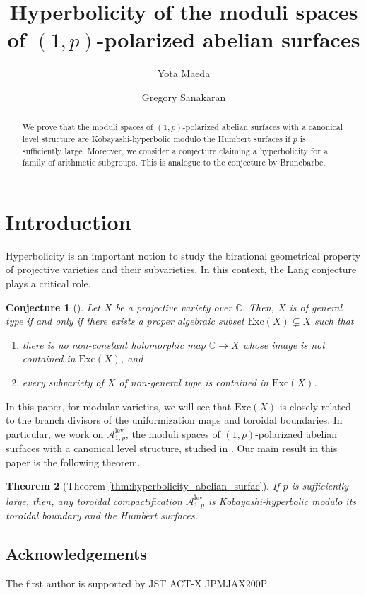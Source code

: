 \documentclass[12pt, pdftex]{amsart}
\title[Hyperbolicity of the moduli spaces of $(1,p)$-polarized abelian surfaces]
{Hyperbolicity of the moduli spaces of $(1,p)$-polarized 
abelian surfaces}
\author{Yota Maeda}
\author{Gregory Sanakaran}
\theoremstyle{plain}
\newtheorem{thm}{Theorem}[section]
\newtheorem{conj}[thm]{Conjecture}
\theoremstyle{definition}
\numberwithin{equation}{section}
\def\A{{\mathbb A}}
\def\C{{\mathbb C}}
\def\Exc{\mathrm{Exc}}
\def\lev{\mathrm{lev}}
\def\A{\mathcal{A}}
\begin{document}
\maketitle

\begin{abstract}
    We prove that the moduli spaces of $(1,p)$-polarized abelian surfaces with a canonical level structure are Kobayashi-hyperbolic modulo the Humbert surfaces if $p$ is sufficiently large.
    Moreover, we consider a conjecture claiming a hyperbolicity for a family of arithmetic subgroups.
    This is analogue to the conjecture by Brunebarbe.
\end{abstract}

\section{Introduction}
Hyperbolicity is an important notion to study the birational geometrical property of projective varieties and their subvarieties.
In this context, the Lang conjecture plays a critical role.
\begin{conj}[{\cite{GG79, La87}}]
Let $X$ be a projective variety over $\C$.
Then, $X$ is of general type if and only if  there exists a proper algebraic subset $\Exc(X)\subsetneq X$ such that
\begin{enumerate}
    \item there is no non-constant holomorphic map $\C\to X$ whose image is not contained in $\Exc(X)$, and
    \item every subvariety of $X$ of non-general type is contained in $\Exc(X)$. 
\end{enumerate}
    
\end{conj}
In this paper, for modular varieties, we will see that $\Exc(X)$ is closely related to the branch divisors of the uniformization maps and toroidal boundaries.
In particular, we work on $\A_{1,p}^{\lev}$, the moduli spaces of $(1,p)$-polarizaed abelian surfaces with a canonical level structure, studied in \cite{HS94, HKW93}.
Our main result in this paper is the following theorem.
\begin{thm}[{Theorem \ref{thm:hyperbolicity_abelian_surfac}}]
\label{mainthm:hyperbolicity_abelian_surface}
If $p$ is sufficiently large, then, any toroidal compactification $\overline{\A_{1,p}^{\lev}}$ is Kobayashi-hyperbolic modulo its toroidal boundary and the Humbert surfaces.
\end{thm}

\subsection*{Acknowledgements}
The first author is supported by JST ACT-X JPMJAX200P.
\end{document}
